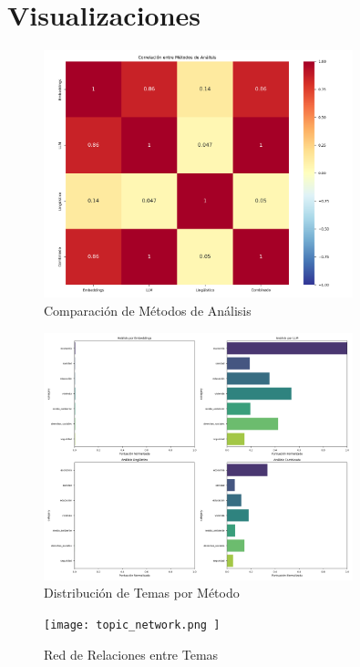 \documentclass[12pt,a4paper]{article}
\begin{document}
\section{Visualizaciones}

\begin{figure}[H]
    \centering
    \includegraphics[width=0.8\textwidth]{ method_comparison.png }
    \caption{ Comparación de Métodos de Análisis }
    \label{fig:method_comparison}
\end{figure}

\begin{figure}[H]
    \centering
    \includegraphics[width=0.8\textwidth]{ topic_distribution_by_method.png }
    \caption{ Distribución de Temas por Método }
    \label{fig:topic_distribution_by_method}
\end{figure}

\begin{figure}[H]
    \centering
    \texttt{[image:  topic\_network.png ]}
    \caption{ Red de Relaciones entre Temas }
    \label{fig:topic_network}
\end{figure}
\end{document}
